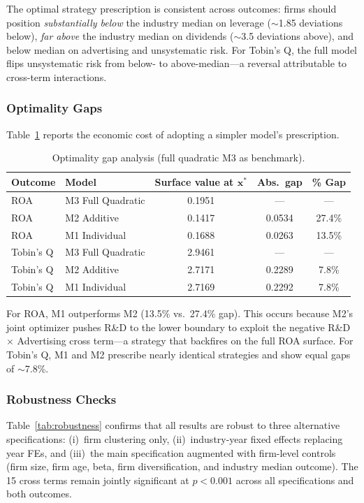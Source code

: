 \documentclass[12pt]{article}
\newcommand{\bx}{\mathbf{x}}
\begin{document}
The optimal strategy prescription is consistent across outcomes: firms should position \emph{substantially below} the industry median on leverage ($\sim$1.85 deviations below), \emph{far above} the industry median on dividends ($\sim$3.5 deviations above), and below median on advertising and unsystematic risk. For Tobin's Q, the full model flips unsystematic risk from below- to above-median---a reversal attributable to cross-term interactions.

\subsubsection{Optimality Gaps}

Table~\ref{tab:gaps} reports the economic cost of adopting a simpler model's prescription.

\begin{table}[htbp]
\centering
\caption{Optimality gap analysis (full quadratic M3 as benchmark).}
\label{tab:gaps}
\begin{tabular}{llccc}
\toprule
Outcome & Model & Surface value at $\bx^*$ & Abs.\ gap & \% Gap \\
\midrule
ROA       & M3 Full Quadratic & 0.1951 & --- & --- \\
ROA       & M2 Additive       & 0.1417 & 0.0534 & 27.4\% \\
ROA       & M1 Individual     & 0.1688 & 0.0263 & 13.5\% \\
\addlinespace
Tobin's Q & M3 Full Quadratic & 2.9461 & --- & --- \\
Tobin's Q & M2 Additive       & 2.7171 & 0.2289 & 7.8\% \\
Tobin's Q & M1 Individual     & 2.7169 & 0.2292 & 7.8\% \\
\bottomrule
\end{tabular}
\end{table}

For ROA, M1 outperforms M2 (13.5\% vs.\ 27.4\% gap). This occurs because M2's joint optimizer pushes R\&D to the lower boundary to exploit the negative R\&D $\times$ Advertising cross term---a strategy that backfires on the full ROA surface. For Tobin's Q, M1 and M2 prescribe nearly identical strategies and show equal gaps of $\sim$7.8\%.

\subsubsection{Robustness Checks}

Table~\ref{tab:robustness} confirms that all results are robust to three alternative specifications: (i)~firm clustering only, (ii)~industry-year fixed effects replacing year FEs, and (iii)~the main specification augmented with firm-level controls (firm size, firm age, beta, firm diversification, and industry median outcome). The 15 cross terms remain jointly significant at $p < 0.001$ across all specifications and both outcomes.
\end{document}
